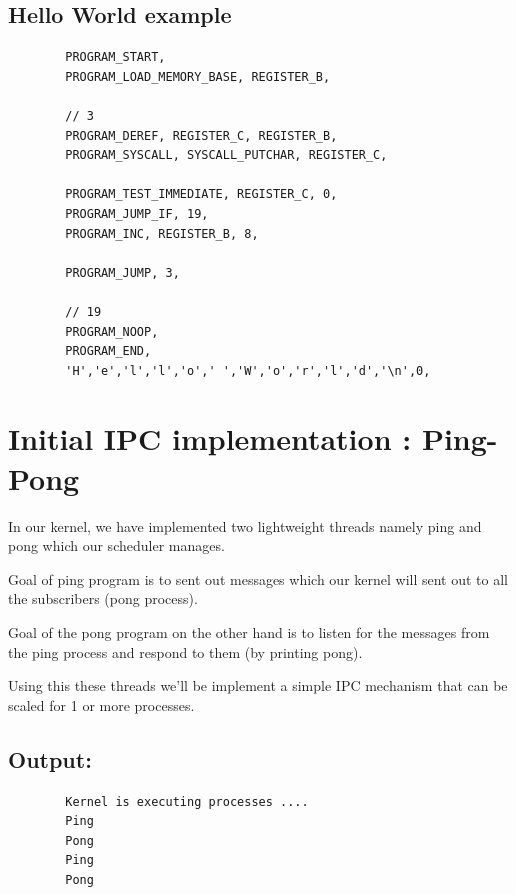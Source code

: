 \documentclass[12pt]{report}
\begin{document}
    \pagebreak
    
    \section{Hello World example}
    \begin{verbatim}
        PROGRAM_START,
        PROGRAM_LOAD_MEMORY_BASE, REGISTER_B,

        // 3
        PROGRAM_DEREF, REGISTER_C, REGISTER_B,
        PROGRAM_SYSCALL, SYSCALL_PUTCHAR, REGISTER_C,
        
        PROGRAM_TEST_IMMEDIATE, REGISTER_C, 0,
        PROGRAM_JUMP_IF, 19,
        PROGRAM_INC, REGISTER_B, 8,

        PROGRAM_JUMP, 3,

        // 19
        PROGRAM_NOOP,
        PROGRAM_END,
        'H','e','l','l','o',' ','W','o','r','l','d','\n',0,
    \end{verbatim}

    \chapter{Initial IPC implementation : Ping-Pong}
    In our kernel, we have implemented two lightweight threads namely ping and pong 
    which our scheduler manages.

    Goal of ping program is to sent out messages which our kernel will sent out to all the subscribers (pong process).

    Goal of the pong program on the other hand is to listen for the messages from the ping process and respond to them (by printing pong).

    Using this these threads we’ll be implement a simple IPC mechanism that can be scaled for 1 or more processes.

    \section{Output:}
    \begin{verbatim}
        Kernel is executing processes ....
        Ping
        Pong
        Ping
        Pong
    \end{verbatim}

    \pagebreak
\end{document}
